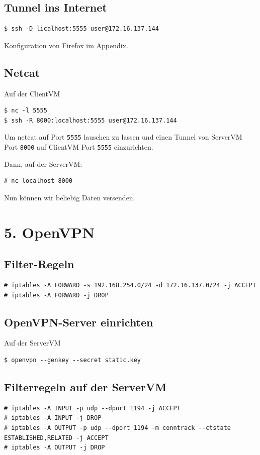 \documentclass[10pt,a4paper]{article}
\begin{document}
\subsection{Tunnel ins Internet}
\begin{verbatim}
$ ssh -D licalhost:5555 user@172.16.137.144
\end{verbatim}
Konfiguration von Firefox im Appendix.

\subsection{Netcat}
Auf der ClientVM
\begin{verbatim}
$ nc -l 5555
$ ssh -R 8000:localhost:5555 user@172.16.137.144
\end{verbatim}
Um netcat auf Port \texttt{5555} lauschen zu lassen und einen Tunnel von ServerVM Port \texttt{8000} auf ClientVM Port \texttt{5555} einzurichten.

Dann, auf der ServerVM:
\begin{verbatim}
# nc localhost 8000
\end{verbatim}
Nun können wir beliebig Daten versenden.

\setcounter{section}{5}
\section*{5. OpenVPN}
\setcounter{subsection}{0}
\subsection{Filter-Regeln}
\begin{verbatim}
# iptables -A FORWARD -s 192.168.254.0/24 -d 172.16.137.0/24 -j ACCEPT
# iptables -A FORWARD -j DROP
\end{verbatim}

\subsection{OpenVPN-Server einrichten}

Auf der ServerVM
\begin{verbatim}
$ openvpn --genkey --secret static.key
\end{verbatim}

\subsection{Filterregeln auf der ServerVM}
\begin{verbatim}
# iptables -A INPUT -p udp --dport 1194 -j ACCEPT
# iptables -A INPUT -j DROP
# iptables -A OUTPUT -p udp --dport 1194 -m conntrack --ctstate ESTABLISHED,RELATED -j ACCEPT
# iptables -A OUTPUT -j DROP
\end{verbatim}
\end{document}

